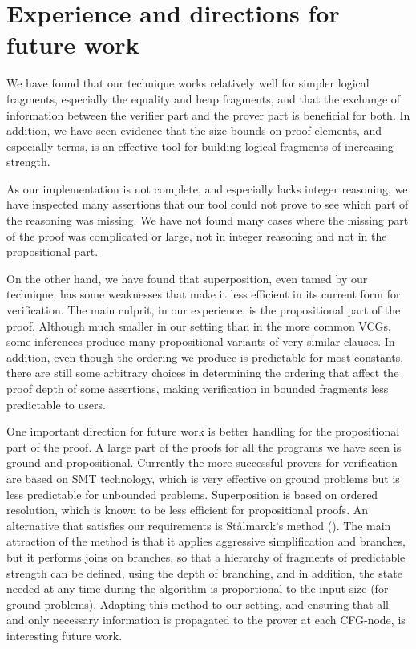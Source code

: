 \section{Experience and directions for future work}
We have found that our technique works relatively well for simpler logical fragments, especially the equality and heap fragments, and that the exchange of information between the verifier part and the prover part is beneficial for both. In addition, we have seen evidence that the size bounds on proof elements, and especially terms, is an effective tool for building logical fragments of increasing strength.

As our implementation is not complete, and especially lacks integer reasoning, we have inspected many assertions that our tool could not prove to see which part of the reasoning was missing. We have not found many cases where the missing part of the proof was complicated or large, not in integer reasoning and not in the propositional part.

On the other hand, we have found that superposition, even tamed by our technique, has some weaknesses that make it less efficient in its current form for verification. The main culprit, in our experience, is the propositional part of the proof. Although much smaller in our setting than in the more common VCGs, some inferences produce many propositional variants of very similar clauses. 
In addition, even though the ordering we produce is predictable for most constants, there are still some arbitrary choices in determining the ordering that affect the proof depth of some assertions, making verification in bounded fragments less predictable to users.

One important direction for future work is better handling for the propositional part of the proof.
A large part of the proofs for all the programs we have seen is ground and propositional.
Currently the more successful provers for verification are based on SMT technology, which is very effective on ground problems but is less predictable for unbounded problems. Superposition is based on ordered resolution, which is known to be less efficient for propositional proofs.
An alternative that satisfies our requirements is St{\aa}lmarck's method (\cite{DBLP:conf/fmcad/SheeranS98}). The main attraction of the method is that it applies aggressive simplification and branches, but it performs joins on branches, so that a hierarchy of fragments of predictable strength can be defined, using the depth of branching, and in addition, the state needed at any time during the algorithm is proportional to the input size (for ground problems). 
Adapting this method to our setting, and ensuring that all and only necessary information is propagated to the prover at each CFG-node, is interesting future work.

